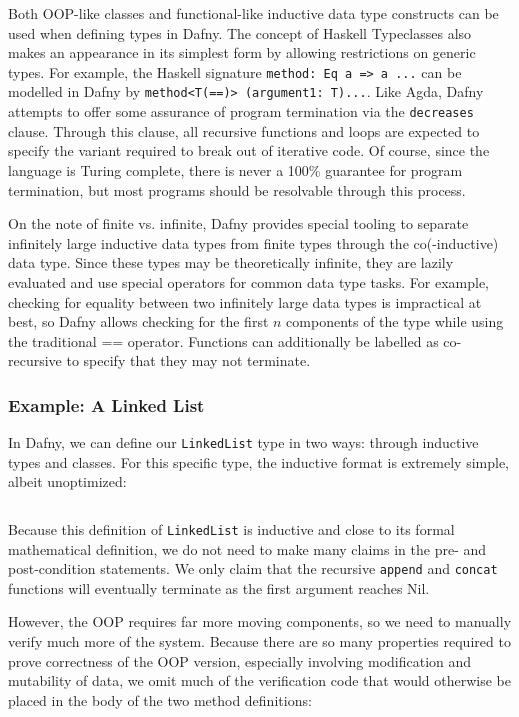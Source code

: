 \documentclass{article}
\begin{document}
Both OOP-like classes and functional-like inductive data type constructs can be used when defining types in Dafny.
The concept of Haskell Typeclasses also makes an appearance in its simplest form
by allowing restrictions on generic types. For example, the Haskell signature \texttt{method: Eq a => a ...} can be modelled
in Dafny by \texttt{method<T(==)> (argument1: T)...}. Like Agda, Dafny attempts to offer some assurance
of program termination via the \texttt{decreases} clause. Through this clause, all recursive functions and loops
are expected to specify the variant required to break out of iterative code. Of course, since the language is Turing complete,
there is never a 100\% guarantee for program termination, but most programs should be resolvable through
this process.

On the note of finite vs. infinite, Dafny provides special tooling to
separate infinitely large inductive data types from finite types through
the co(-inductive) data type. Since these types may be theoretically infinite,
they are lazily evaluated and use special operators for common data type tasks.
For example, checking for equality between two infinitely large data types is impractical at best,
so Dafny allows checking for the first $n$ components of the type while using the traditional == operator.
Functions can additionally be labelled as co-recursive
to specify that they may not terminate.

\subsubsection{Example: A Linked List}

In Dafny, we can define our \texttt{LinkedList} type in two ways: through inductive types and classes.
For this specific type, the inductive format is extremely simple, albeit unoptimized:
\inputminted{python}{linked_list/main.dfy} %

Because this definition of \texttt{LinkedList} is inductive and close to its formal mathematical definition,
we do not need to make many claims in the pre- and post-condition statements. We only claim that
the recursive \texttt{append} and \texttt{concat} functions will eventually terminate as
the first argument reaches Nil.

However, the OOP requires far more moving components, so we need to manually verify much more of the system.
Because there are so many properties required to prove correctness of the OOP version,
especially involving modification and mutability of data,
we omit much of the verification code that would otherwise be placed in the body of the two method definitions:
\inputminted{rust}{linked_list/main_class.dfy} %
\end{document}
